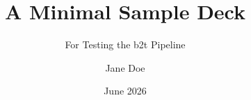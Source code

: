 \documentclass{beamer}
\title{A Minimal Sample Deck}
\subtitle{For Testing the b2t Pipeline}
\author{Jane Doe}
\institute{Department of Examples}
\date{June 2026}
\begin{document}
\begin{frame}
  \titlepage
\end{frame}


\end{document}

